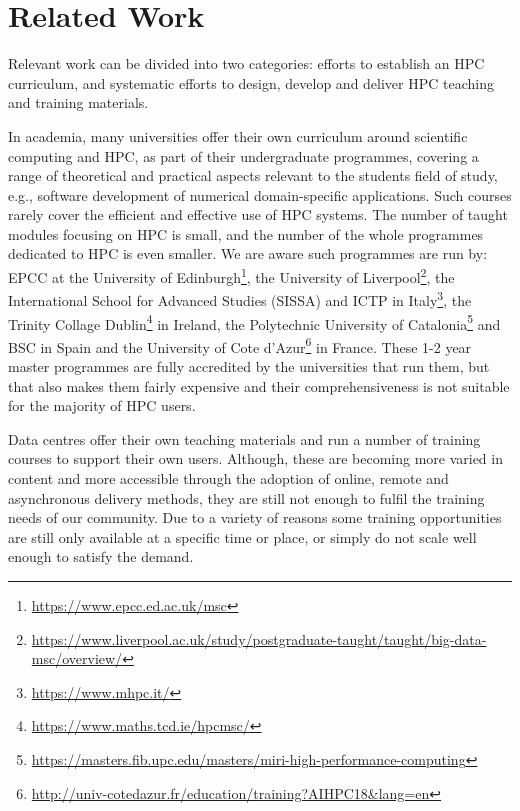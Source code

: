 \documentclass[jocse]{jocseart}
\begin{document}
\section{Related Work}

\label{sec:related}

Relevant work can be divided into two categories: efforts to establish an HPC curriculum, and systematic efforts to design, develop and deliver HPC teaching and training materials.

In academia, many universities offer their own curriculum around scientific computing and HPC, as part of their undergraduate programmes, covering a range of theoretical and practical aspects relevant to the students field of study, e.g., software development of numerical domain-specific applications.
Such courses rarely cover the efficient and effective use of HPC systems.
The number of taught modules focusing on HPC is small, and the number of the whole programmes dedicated to HPC is even smaller.
We are aware such programmes are run by: EPCC at the University of Edinburgh\footnote{\url{https://www.epcc.ed.ac.uk/msc}}, the University of Liverpool\footnote{\url{https://www.liverpool.ac.uk/study/postgraduate-taught/taught/big-data-msc/overview/}}, the International School for Advanced Studies (SISSA) and ICTP in Italy\footnote{\url{https://www.mhpc.it/}}, the Trinity Collage Dublin\footnote{\url{https://www.maths.tcd.ie/hpcmsc/}} in Ireland, the Polytechnic University of Catalonia\footnote{\url{https://masters.fib.upc.edu/masters/miri-high-performance-computing}} and BSC in Spain and the University of Cote d'Azur\footnote{\url{http://univ-cotedazur.fr/education/training?AIHPC18&lang=en}} in France. These 1-2 year master programmes are fully accredited by the universities that run them, but that also makes them fairly expensive and their comprehensiveness is not suitable for the majority of HPC users.

\medskip

Data centres offer their own teaching materials and run a number of training courses to support their own users.
Although, these are becoming more varied in content and more accessible through the adoption of online, remote and asynchronous delivery methods, they are still not enough to fulfil the training needs of our community. Due to a variety of reasons some training opportunities are still only available at a specific time or place, or simply do not scale well enough to satisfy the demand.

\medskip
\end{document}
